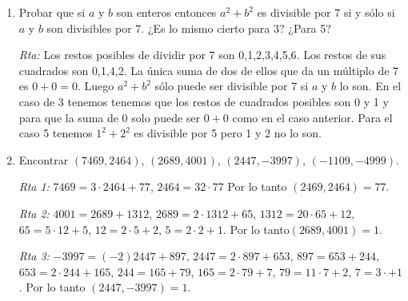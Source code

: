 \documentclass[12pt,spanish,makeidx]{amsbook}
\newcommand{\rta}{\noindent\textit{Rta: }}
\begin{document}
\begin{enumerate}
\begin{enumerate}
	\item Probar que el producto de cuatro enteros consecutivos es divisible por 24.
	
	\rta Como en el ejercicio anterior, ahora tenemos que uno de los números es divisible por 4 y otro de los restantes es divisible por 2. Entonces el producto es divisible por 8 y también hay uno que es múltiplo de 3 por lo cual el producto es divisible por $24=3\times8$.
	
	\textit{Rta Alternativa:} el producto de cuatro enteros consecutivos es de la forma $n(n-1)(n-2)(n-3)$. Ahora bien,
	\begin{equation*}
		\binom{n}{4} = \frac{n!}{(n-4)!4!} = \frac{n(n-1)(n-2)(n-3)}{4!}.
	\end{equation*}
	Por un teorema de la teórica sabemos que $\binom{n}{4}$ es un número entero, por lo tanto $ \frac{n(n-1)(n-2)(n-3)}{4!}$ es entero, lo cual quiere decir que $4! | n(n-1)(n-2)(n-3)$ (y $4! = 24$). 
	
\end{enumerate}



\smallskip
\item Probar que si $a$ y $b$ son enteros entonces $a^2+b^2$ es divisible por 7 si y s\'olo si $a$ y $b$ son divisibles por 7. ¿Es lo mismo cierto para 3? ¿Para 5?

\rta Los restos posibles de dividir por 7 son 0,1,2,3,4,5,6. Los restos de sus cuadrados son 0,1,4,2. La única suma de dos de ellos que da un múltiplo de 7 es $0+0=0$. Luego $a^2+b^2$ sólo puede ser divisible por 7 si $a$ y $b$ lo son.
En el caso de 3 tenemos tenemos que los restos de cuadrados posibles son 0 y 1 y para que la suma de 0 solo puede ser $0+0$ como en el caso anterior. Para el caso 5 tenemos $1^2+2^2$ es divisible por 5 pero 1 y 2 no lo son.

\smallskip


\item Encontrar $(7469,2464)$, $(2689,4001)$, $(2447,-3997)$, $(-1109,-4999)$.

\noindent\textit{Rta 1: }  $7469=3\cdot 2464+ 77$, $2464= 32\cdot77$ Por lo tanto $(2469,2464)=77$.

\noindent\textit{Rta 2: }  $4001=2689+ 1312$, $2689=2\cdot 1312+65$,  $1312=20\cdot 65+12$,  $65=5\cdot 12+5$,  $12=2\cdot 5+2$, $ 5=2\cdot 2+1$. Por lo tanto$ (2689, 4001)=1$.

\noindent\textit{Rta 3: } $-3997=(-2)2447+897$,  $2447=2\cdot 897+653$,  $897=653+244$,  $653=2\cdot244+165$, $244=165+79$,  $165=2\cdot79+7$, $79=11\cdot7+2$, $7=3\cdot+1$. Por lo tanto $(2447,-3997)=1$.


\end{enumerate}
\end{document}
